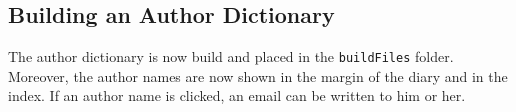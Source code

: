 \subsection{Building an Author Dictionary}
\label{task:20140822_jkn0}
The author dictionary is now build and placed in the {\tt buildFiles} folder. Moreover, the author names are now shown in the margin of the diary and in the index. If an author name is clicked, an email can be written to him or her.
